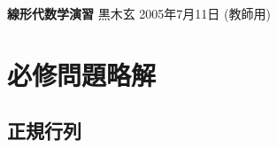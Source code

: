 \documentclass[12pt,twoside]{jarticle}
\newcommand\commentout[1]{#1}
\newcommand\commentout[1]{}
\begin{document}

%
%



\noindent
{\Large\bf 線形代数学演習}
\hfill
{\large 黒木玄}
\qquad
2005年7月11日
\commentout{\quad (教師用)}


\tableofcontents


\section{必修問題略解}


\subsection{正規行列}
\end{document}
